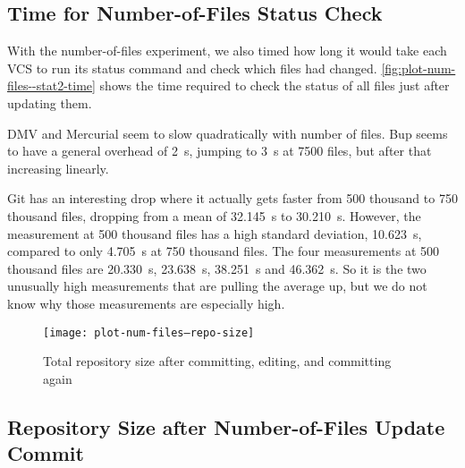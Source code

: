 \subsection{Time for Number-of-Files Status Check}

With the number-of-files experiment, we also timed how long it would take each
\gls{VCS} to run its status command and check which files had changed.
\autoref{fig:plot-num-files--stat2-time} shows the time required to check the
status of all files just after updating them.

\gls{DMV} and Mercurial seem to slow quadratically with number of files. Bup
seems to have a general overhead of \SI{2}{\second}, jumping to \SI{3}{\second}
at \num{7500} files, but after that increasing linearly.



Git has an interesting drop where it actually gets faster from \num{500}
thousand to \num{750} thousand files, dropping from a mean of \SI{32.145}{\s} to
\SI{30.210}{\s}. However, the measurement at \num{500} thousand files has a high
standard deviation, \SI{10.623}{\s}, compared to only \SI{4.705}{\s} at
\num{750} thousand files. The four measurements at \num{500} thousand files are
\SI{20.330}{\s}, \SI{23.638}{\s}, \SI{38.251}{\s} and \SI{46.362}{\s}. So it is
the two unusually high measurements that are pulling the average up, but we do
not know why those measurements are especially high.

%


\begin{figure}[p]
    \caption{Total repository size after committing, editing, and committing again}
    \label{fig:plot-num-files--repo-size}
    \centering

    \explaindiskspaceplot

    \texttt{[image: plot-num-files--repo-size]}
\end{figure}

\cleardoublepage

\subsection{Repository Size after Number-of-Files Update Commit}

